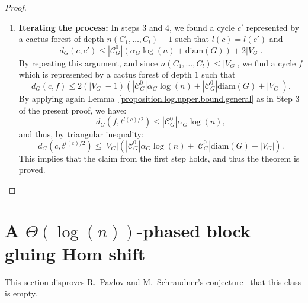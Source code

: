 \documentclass{article}
\begin{document}
\begin{proof}
\begin{enumerate}
Figure~\ref{cactus-l} (right) illustrates the transformation of $(C'_1,\ldots,C'_l)$ into $(C''_1,\ldots,C''_l)$.

\item \textbf{Iterating the process:} In steps 3 and 4, we found a cycle $c'$ represented by a cactus forest of depth $n(C_1,\ldots,C_l)-1$ such that $l(c)=l(c')$ and 
\[
d_G(c,c') \le |\mathcal{C}_G^0| \left(\alpha_G \log(n)+ \text{diam}(G) \right) + 2|V_G|.
\] 
By repeating this argument, and since $n(C_1,\ldots,C_l) \le |V_G|$, we find a cycle $f$ which is represented by a cactus forest of depth $1$ such that
\[
d_G(c,f) \le 2(|V_G| - 1) (|\mathcal{C}_G^0| \alpha_G \log(n) + |\mathcal{C}_G^0| \text{diam}(G) + |V_G|).
\]
By applying again Lemma~\ref{proposition.log.upper.bound.general} as in Step $3$ of the present proof, we have:
\[
d_G(f,t^{l(c)/2}) \le |\mathcal{C}_G^0|\alpha_G  \log(n),
\]
and thus, by triangular inequality:
\[
d_G(c, t^{l(c)/2}) \le |V_G|(|\mathcal{C}_G^0|\alpha_G \log(n) + |\mathcal{C}_G^0| \text{diam}(G) + |V_G|).
\]
This implies that the claim from the first step holds, and thus the theorem is proved.\qedhere
\end{enumerate}
\end{proof}

\section{A $\Theta(\log(n))$-phased block gluing Hom shift\label{section.log.existence}}

This section disproves R.~Pavlov and M.~Schraudner's conjecture~\cite{CM18} that this class is empty.
\end{document}
